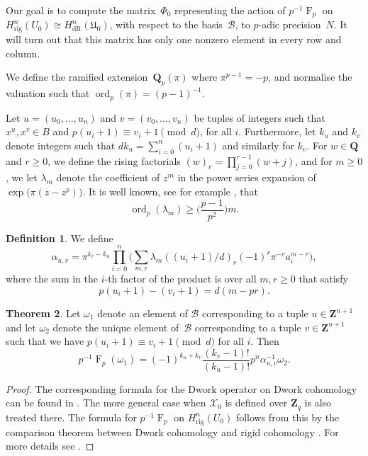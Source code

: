 \documentclass[a4paper,11pt]{article}
\numberwithin{equation}{section}
\newcommand{\ZZ}{\mathbf{Z}} %
\newcommand{\QQ}{\mathbf{Q}} %
\DeclareMathOperator{\ord}{ord}          %
\DeclareMathOperator{\Frob}{F}           %
\providecommand{\HdR}{H_{\text{dR}}}    %
\providecommand{\Hrig}{H_{\text{rig}}}  %
\providecommand{\cB}{\mathcal{B}} %
\theoremstyle{definition}
\newtheorem{thm}{Theorem}[section]
\newtheorem{defn}[thm]{Definition}
\begin{document}
Our goal is to compute 
the matrix~$\Phi_0$ representing the action of $p^{-1} \Frob_p$ on 
$\Hrig^n(U_0) \cong \HdR^n(\mathfrak{U}_0)$, with respect to the basis~$\cB$, 
to $p$-adic precision~$N$. It will turn out that this matrix has only one
nonzero element in every row and column.

We define the ramified extension~$\QQ_p(\pi)$ where $\pi^{p-1} = -p$, 
and normalise the valuation such that \mbox{$\ord_p(\pi) = (p-1)^{-1}$}.

Let $u = (u_0, \dotsc, u_n)$ and $v = (v_0, \dotsc, v_n)$ be tuples 
of integers such that $x^u, x^v \in B$ and $p (u_i+1) \equiv v_i+1 \pmod{d}$,
for all $i$. Furthermore, let $k_u$ and $k_v$ denote integers such that 
$d k_u = \sum_{i=0}^n (u_i + 1)$ and similarly for $k_v$. For $w \in \QQ$ 
and $r \geq 0$, we define the rising factorials $(w)_r = \prod_{j=0}^{r-1} (w + j)$, 
and for $m \geq 0$, we let $\lambda_m$ denote the coefficient of $z^m$ in the power series expansion 
of $\exp \bigl( \pi (z - z^p) \bigr)$. It is well known, see for example \cite{Dwork1962}, that
\begin{equation} \label{eqn:dworkbound}
\ord_p(\lambda_m) \geq \bigl( \frac{p-1}{p^2} \bigr) m. 
\end{equation}

\begin{defn} We define \label{defn:alpha}
\[
\alpha_{u,v} = \pi^{k_v - k_u} \prod_{i = 0}^n \biggl( \sum_{m, r} \lambda_m ((u_i + 1) / d)_r (-1)^r \pi^{-r} a_i^{m-r} \biggr),
\]
where the sum in the $i$-th factor of the product is over all $m, r \geq 0$  
that satisfy
\[
p(u_i+1)-(v_i+1)=d(m-pr).
\]
\end{defn}

\begin{thm} \label{thm:01-03-diagfrob}
Let $\omega_1$ denote an element of $\cB$ corresponding to a tuple 
$u \in \ZZ^{n+1}$ and let $\omega_2$ denote the unique element of~$\cB$ 
corresponding to a tuple $v \in \ZZ^{n+1}$ such that
we have $p (u_i + 1) \equiv v_i + 1 \pmod{d}$ for all $i$. Then
\begin{equation*}
p^{-1} \Frob_p (\omega_1) = 
    (-1)^{k_u + k_v} \frac{(k_v - 1)!}{(k_u - 1)!} p^n \alpha_{u,v}^{-1} \omega_2.
\end{equation*}
\end{thm}

\begin{proof}
The corresponding formula for the Dwork operator on Dwork cohomology can
be found in %
\citep[\S 6.1]{Lauder2004b}. The more general case when $\mathcal{X}_0$ 
is defined over $\ZZ_q$ is also treated there. The formula for $p^{-1} \Frob_p$ on $\Hrig^n(U_0)$ 
follows from this by the comparison theorem between Dwork cohomology 
and rigid cohomology \cite[Theorem 1.12]{Katz}. For more details see 
\cite[Theorem 4.4]{Gerkmann2007}.
\end{proof}
\end{document}
